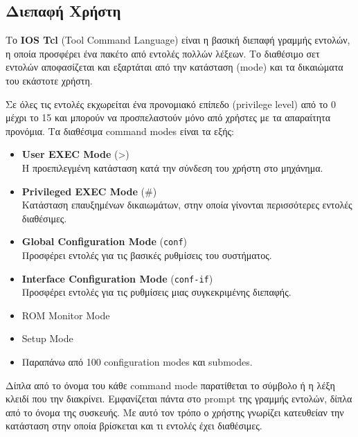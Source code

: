 \documentclass[12pt]{article}
\begin{document}
\subsection{Διεπαφή Χρήστη}
Το \textbf{IOS Tcl} (Tool Command Language) είναι η βασική διεπαφή γραμμής εντολών, η οποία προσφέρει ένα πακέτο από εντολές πολλών λέξεων. Το διαθέσιμο σετ εντολών αποφασίζεται και εξαρτάται από την κατάσταση (mode) και τα δικαιώματα του εκάστοτε χρήστη.\par 
Σε όλες τις εντολές εκχωρείται ένα προνομιακό επίπεδο (privilege level) από το 0 μέχρι το 15 και μπορούν να προσπελαστούν μόνο από χρήστες με τα απαραίτητα προνόμια. Τα διαθέσιμα command modes είναι τα εξής:
\begin{itemize}
	\item \textbf{User EXEC Mode} (>)\\
	H προεπιλεγμένη κατάσταση κατά την σύνδεση του χρήστη στο μηχάνημα.
	\item \textbf{Privileged EXEC Mode} (\#)\\
	Κατάσταση επαυξημένων δικαιωμάτων, στην οποία γίνονται περισσότερες εντολές διαθέσιμες.
	\item \textbf{Global Configuration Mode} (\texttt{conf})\\
	Προσφέρει εντολές για τις βασικές ρυθμίσεις του συστήματος.
	\item \textbf{Interface Configuration Mode} (\texttt{conf-if})\\
	Προσφέρει εντολές για τις ρυθμίσεις μιας συγκεκριμένης διεπαφής.
	\item ROM Monitor Mode
	\item Setup Mode
	\item Παραπάνω από 100 configuration modes και submodes.
\end{itemize}
Δίπλα από το όνομα του κάθε command mode παρατίθεται το σύμβολο ή η λέξη κλειδί που την διακρίνει. Εμφανίζεται πάντα στο prompt της γραμμής εντολών, δίπλα από το όνομα της συσκευής. Με αυτό τον τρόπο ο χρήστης γνωρίζει κατευθείαν την κατάσταση στην οποία βρίσκεται και τι εντολές έχει διαθέσιμες.
\end{document}
